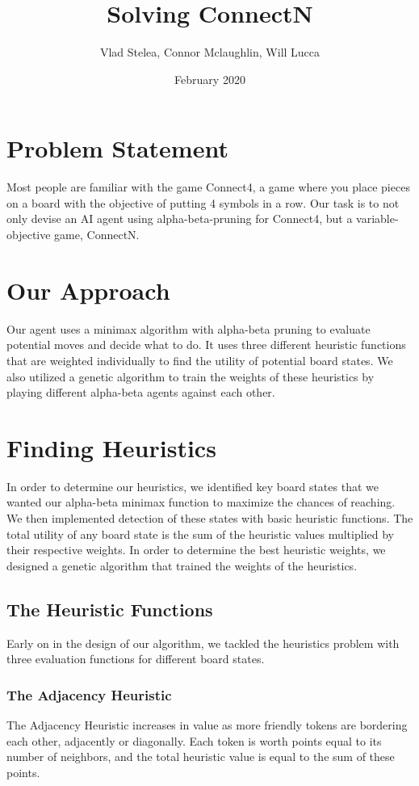 \documentclass{article}
\title{Solving ConnectN}
\author{Vlad Stelea, Connor Mclaughlin, Will Lucca}
\date{February 2020}
\begin{document}
\maketitle

\section{Problem Statement}
Most people are familiar with the game Connect4, a game where you place pieces on a board with the objective of putting 4 symbols in a row. Our task is to not only devise an AI agent using alpha-beta-pruning for Connect4, but a variable-objective game, ConnectN. 

\section{Our Approach}
Our agent uses a minimax algorithm with alpha-beta pruning to evaluate potential moves and decide what to do. It uses three different heuristic functions that are weighted individually to find the utility of potential board states. We also utilized a genetic algorithm to train the weights of these heuristics by playing different alpha-beta agents against each other.

\section{Finding Heuristics}
In order to determine our heuristics, we identified key board states that we wanted our alpha-beta minimax function to maximize the chances of reaching. We then implemented detection of these states with basic heuristic functions. The total utility of any board state is the sum of the heuristic values multiplied by their respective weights. In order to determine the best heuristic weights, we designed a genetic algorithm that trained the weights of the heuristics.

\subsection{The Heuristic Functions}
Early on in the design of our algorithm, we tackled the heuristics problem with three evaluation functions for different board states.

\subsubsection*{The Adjacency Heuristic}
The Adjacency Heuristic increases in value as more friendly tokens are bordering each other, adjacently or diagonally. Each token is worth points equal to its number of neighbors, and the total heuristic value is equal to the sum of these points.
\end{document}
